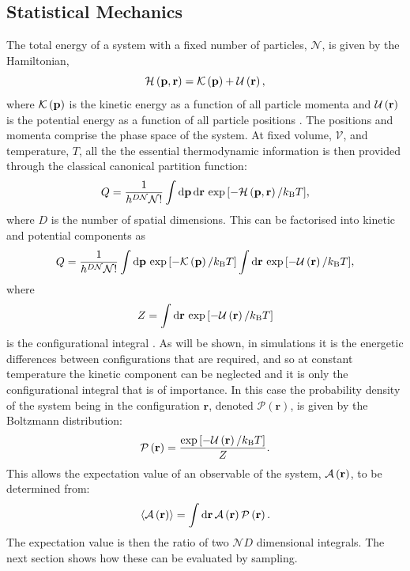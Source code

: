 \subsection{Statistical Mechanics}

The total energy of a system with a fixed number of particles, $\mathcal{N}$, is given by the Hamiltonian,
\begin{equation}
	\mathcal{H}\left(\mathbf{p},\mathbf{r}\right) = \mathcal{K}\left(\mathbf{p}\right)+\mathcal{U}\left(\mathbf{r}\right),
\end{equation}
where $\mathcal{K}\left(\mathbf{p}\right)$ is the kinetic energy as a function of all particle momenta and $\mathcal{U}\left(\mathbf{r}\right)$ is the potential energy as a function of all particle positions \cite{Frenkel2002}.
The positions and momenta comprise the phase space of the system.
At fixed volume, $\mathcal{V}$, and temperature, $T$, all the the essential thermodynamic information is then provided through the classical canonical partition function:
\begin{equation}
	Q = \frac{1}{h^{D\mathcal{N}}\mathcal{N}!}\int \text{d}\mathbf{p}\,\text{d}\mathbf{r}\,\exp{\left[-\mathcal{H}\left(\mathbf{p},\mathbf{r}\right)/ k_\text{B}T\right]},
\end{equation}
where $D$ is the number of spatial dimensions.
This can be factorised into kinetic and potential components as
\begin{equation}
	Q = \frac{1}{h^{D\mathcal{N}}\mathcal{N}!}\int \text{d}\mathbf{p}\,\exp{\left[-\mathcal{K}\left(\mathbf{p}\right)/k_\text{B}T\right]} \int \text{d}\mathbf{r}\,\exp{\left[-\mathcal{U}\left(\mathbf{r}\right)/k_\text{B}T\right]},
\end{equation}
where
\begin{equation}
	Z = \int \text{d}\mathbf{r}\,\exp{\left[-\mathcal{U}\left(\mathbf{r}\right)/k_\text{B}T\right]}
\end{equation}
is the configurational integral \cite{Allen2017}. 
As will be shown, in \mc{} simulations it is the energetic differences between configurations that are required, and so at constant temperature the kinetic component can be neglected and it is only the configurational integral that is of importance.
In this case the probability density of the system being in the configuration $\mathbf{r}$, denoted $\mathcal{P}\left(\mathbf{r}\right)$, is given by the Boltzmann distribution:
\begin{equation}
	\label{eq:boltzmann}
	\mathcal{P}\left(\mathbf{r}\right) = \frac{\exp{\left[-\mathcal{U}\left(\mathbf{r}\right)/k_\text{B}T\right]}}{Z}.
\end{equation}
This allows the expectation value of an observable of the system, $\mathcal{A}\left(\mathbf{r}\right)$, to be determined from:
\begin{equation}
	\label{eq:expectationobs}
		\langle \mathcal{A}\left(\mathbf{r}\right) \rangle = \int \text{d}\mathbf{r}\,\mathcal{A}\left(\mathbf{r}\right) \mathcal{P}\left(\mathbf{r}\right).
\end{equation} 
The expectation value is then the ratio of two $\mathcal{N}D$ dimensional integrals.
The next section shows how these can be evaluated by \mc{} sampling.

